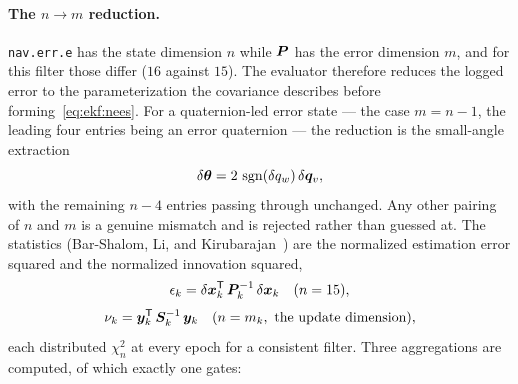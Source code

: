 \paragraph{The $n \to m$ reduction.} \texttt{nav.err.e} has the state
dimension $n$ while $\bm{P}$ has the error dimension $m$, and for this
filter those differ ($16$ against $15$). The evaluator therefore reduces
the logged error to the parameterization the covariance describes before
forming~\eqref{eq:ekf:nees}. For a quaternion-led error state --- the
case $m = n - 1$, the leading four entries being an error quaternion ---
the reduction is the small-angle extraction
\begin{equation}
  \delta\bm{\theta} = 2\,\operatorname{sgn}(\delta q_w)\,\delta\bm{q}_v,
  \label{eq:ekf:reduce}
\end{equation}
with the remaining $n - 4$ entries passing through unchanged. Any other
pairing of $n$ and $m$ is a genuine mismatch and is rejected rather than
guessed at. The statistics
(Bar-Shalom, Li, and Kirubarajan~\cite{barshalom2001}) are the
normalized estimation error squared and the normalized innovation
squared,
\begin{equation}
  \epsilon_k = \delta\bm{x}_k^{\mathsf T}\, \bm{P}_k^{-1}\,
    \delta\bm{x}_k
  \quad (n = 15),
  \label{eq:ekf:nees}
\end{equation}
\begin{equation}
  \nu_k = \bm{y}_k^{\mathsf T}\, \bm{S}_k^{-1}\, \bm{y}_k
  \quad (n = m_k, \text{ the update dimension}),
  \label{eq:ekf:nis}
\end{equation}
each distributed $\chi^2_n$ at every epoch for a consistent filter.
Three aggregations are computed, of which exactly one gates:
